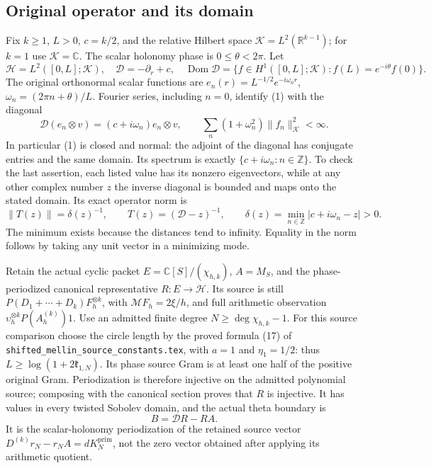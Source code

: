 \documentclass[10pt,a4paper,oneside]{report}
\begin{document}
\subsection{Original operator and its domain}
Fix \(k\ge1\), \(L>0\), \(c=k/2\), and the relative Hilbert space
\(\mathcal K=L^2(\mathbb R^{k-1})\); for \(k=1\) use
\(\mathcal K=\mathbb C\). The scalar holonomy phase is
\(0\le\theta<2\pi\). Let
\[
 \mathscr H=L^2([0,L];\mathcal K),\quad
 \mathscr D=-\partial_r+c,\quad
 \operatorname{Dom}\mathscr D=
 \{f\in H^1([0,L];\mathcal K):f(L)=e^{-i\theta}f(0)\}.
 \tag{1}
\]
The original orthonormal scalar functions are
\(e_n(r)=L^{-1/2}e^{-i\omega_nr}\),
\(\omega_n=(2\pi n+\theta)/L\). Fourier series, including
\(n=0\), identify (1) with the diagonal
\[
 \mathscr D(e_n\otimes v)=(c+i\omega_n)e_n\otimes v,
 \qquad
 \sum_n(1+\omega_n^2)\|f_n\|_{\mathcal K}^2<\infty.
 \tag{2}
\]
In particular (1) is closed and normal: the adjoint of the diagonal
has conjugate entries and the same domain. Its spectrum is exactly
\(\{c+i\omega_n:n\in\mathbb Z\}\). To check the last assertion,
each listed value has its nonzero eigenvectors, while at any other
complex number \(z\) the inverse diagonal is bounded and maps onto
the stated domain. Its exact operator norm is
\[
 \|T(z)\|=\delta(z)^{-1},\qquad
 T(z)=(\mathscr D-z)^{-1},\qquad
 \delta(z)=\min_{n\in\mathbb Z}|c+i\omega_n-z|>0.
 \tag{3}
\]
The minimum exists because the distances tend to infinity. Equality
in the norm follows by taking any unit vector in a minimizing mode.

Retain the actual cyclic packet
\(E=\mathbb C[S]/(\chi_{h,k})\), \(A=M_S\), and the
phase-periodized canonical representative \(R:E\to\mathscr H\).
Its source is still
\(P(D_1+\cdots+D_k)F_h^{\otimes k}\), with
\(\mathcal MF_h=2\xi/h\), and full arithmetic observation
\(\upsilon_h^{\otimes k}P(A_h^{(k)})1\).
Use an admitted finite degree \(N\ge\deg\chi_{h,k}-1\). For this
source comparison choose the circle length by the proved formula
(17) of \texttt{shifted\_\allowbreak{}mellin\_\allowbreak{}source\_\allowbreak{}constants.tex}, with
\(a=1\) and \(\eta_1=1/2\): thus
\(L\ge\log(1+2\mathfrak k_{1,N})\). Its phase source Gram is at
least one half of the positive original Gram. Periodization is
therefore injective on the admitted polynomial source; composing
with the canonical section proves that \(R\) is injective.
It has values in every twisted Sobolev domain, and the actual theta boundary is
\[
 B=\mathscr D R-RA.
 \tag{4}
\]
It is the scalar-holonomy periodization of the retained source vector
\(D^{(k)}r_N-r_NA=dK_N^{\mathrm{prim}}\), not the zero vector
obtained after applying its arithmetic quotient.
\end{document}
